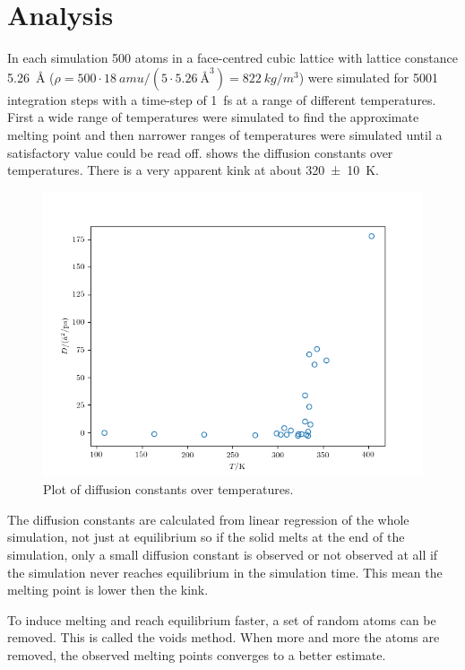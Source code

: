 \documentclass[fleqn]{scrartcl}
\begin{document}
	\section{Analysis}
	In each simulation 500  atoms in a face-centred cubic lattice with lattice constance \SI{5.26}{\angstrom} ($\rho=500\cdot\SI{18}{amu}/(5\cdot\SI{5.26}{\angstrom}^3)=\SI{822}{kg/m^3}$) were simulated for \num{5001} integration steps with a time-step of \SI{1}{fs} at a range of different temperatures. First a wide range of temperatures were simulated to find the approximate melting point and then narrower ranges of temperatures were simulated until a satisfactory value could be read off.  shows the diffusion constants over temperatures. There is a very apparent kink at about \SI{320+-10}{K}. 
	
	\begin{figure}[H]
		\centering
		\includegraphics[width=\textwidth]{melt.png}
		\caption{Plot of diffusion constants over temperatures.}
		\label{fig:melt}	
	\end{figure}
	
	The diffusion constants are calculated from linear regression of the whole simulation, not just at equilibrium so if the solid melts at the end of the simulation, only a small diffusion constant is observed or not observed at all if the simulation never reaches equilibrium in the simulation time. This mean the melting point is lower then the kink.
	
	To induce melting and reach equilibrium faster, a set of random atoms can be removed. This is called the voids method. When more and more the atoms are removed, the observed melting points converges to a better estimate.
	
\end{document}
